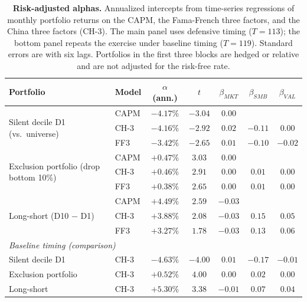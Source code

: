 \documentclass[12pt]{article}
\begin{document}
\begin{table}[t]
\centering\small
\caption{\textbf{Risk-adjusted alphas.} Annualized intercepts from time-series
regressions of monthly portfolio returns on the CAPM, the Fama-French three
factors, and the \citet{liu2019} China three factors (CH-3). The main panel
uses defensive timing ($T=113$); the bottom panel repeats the exercise under
baseline timing ($T=119$). Standard errors are \citet{newey1987} with six lags.
Portfolios in the first three blocks are hedged or relative and are not
adjusted for the risk-free rate.}
\label{tab:alpha}
\vspace{6pt}
\begin{tabular}{llccccc}
\toprule
Portfolio & Model & $\alpha$ (ann.) & $t$ & $\beta_{MKT}$ & $\beta_{SMB}$ & $\beta_{VAL}$ \\
\midrule
\multirow{3}{*}{Silent decile D1 (vs.\ universe)}
 & CAPM & $-4.17\%$ & $-3.04$ & $0.00$ & & \\
 & CH-3 & $\mathbf{-4.16\%}$ & $\mathbf{-2.92}$ & $0.02$ & $-0.11$ & $0.00$ \\
 & FF3  & $-3.42\%$ & $-2.65$ & $0.01$ & $-0.10$ & $-0.02$ \\
\midrule
\multirow{3}{*}{Exclusion portfolio (drop bottom 10\%)}
 & CAPM & $+0.47\%$ & $3.03$ & $0.00$ & & \\
 & CH-3 & $\mathbf{+0.46\%}$ & $\mathbf{2.91}$ & $0.00$ & $0.01$ & $0.00$ \\
 & FF3  & $+0.38\%$ & $2.65$ & $0.00$ & $0.01$ & $0.00$ \\
\midrule
\multirow{3}{*}{Long-short (D10 $-$ D1)}
 & CAPM & $+4.49\%$ & $2.59$ & $-0.03$ & & \\
 & CH-3 & $+3.88\%$ & $2.08$ & $-0.03$ & $0.15$ & $0.05$ \\
 & FF3  & $+3.27\%$ & $1.78$ & $-0.03$ & $0.13$ & $0.06$ \\
\midrule
\multicolumn{7}{l}{\emph{Baseline timing (comparison)}} \\
Silent decile D1        & CH-3 & $-4.63\%$ & $-4.00$ & $0.01$ & $-0.17$ & $-0.01$ \\
Exclusion portfolio     & CH-3 & $+0.52\%$ & $4.00$ & $0.00$ & $0.02$ & $0.00$ \\
Long-short              & CH-3 & $+5.30\%$ & $3.38$ & $-0.01$ & $0.07$ & $0.04$ \\
\bottomrule
\end{tabular}
\end{table}

\end{document}
